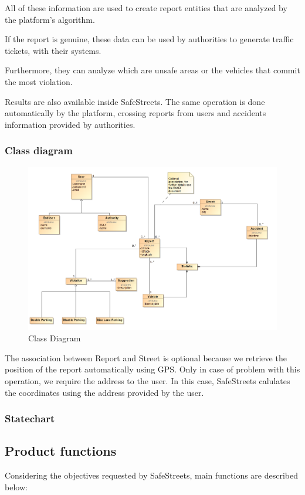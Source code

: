 All of these information are used to create report entities that are analyzed by the platform’s algorithm.

If the report is genuine, these data can be used by authorities to generate traffic tickets, with their systems.

Furthermore, they can analyze which are unsafe areas or the vehicles that commit the most violation.

Results are also available inside SafeStreets.
The same operation is done automatically by the platform, crossing reports from users and accidents information provided by authorities.


\subsubsection{Class diagram}
\begin{figure}[H]
	\centering
	\includegraphics[width=1.12\linewidth]{Images/ClassDiagram.png}
	\caption{Class Diagram}
\end{figure}
The association between Report and Street is optional because we retrieve the position of the report automatically using GPS. Only in case of problem with this operation, we require the address to the user. In this case, SafeStreets calulates the coordinates using the address provided by the user.
\subsubsection{Statechart}


\subsection{Product functions}
Considering the objectives requested by SafeStreets, main functions are described below:

